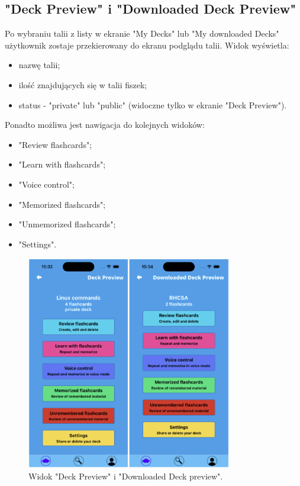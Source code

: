 \subsection{"Deck Preview" i "Downloaded Deck Preview"}
Po wybraniu talii z listy w ekranie "My Decks" lub "My downloaded Decks" użytkownik zostaje przekierowany do ekranu podglądu talii. Widok wyświetla:
\begin{itemize}
    \item nazwę talii;
    \item ilość znajdujących się w talii fiszek;
    \item status - "private" lub "public" (widoczne tylko w ekranie "Deck Preview").
\end{itemize}

Ponadto możliwa jest nawigacja do kolejnych widoków:
\begin{itemize}
    \item "Review flashcards";
    \item "Learn with flashcards";
    \item "Voice control";
    \item "Memorized flashcards";
    \item "Unmemorized flashcards";
    \item "Settings".
\end{itemize}

\begin{figure}[H]
    \centering
    \includegraphics[width=0.8\textwidth]{chapters/chapter_10/images_mobile/mobile_deck_preview}
    \caption{Widok "Deck Preview" i "Downloaded Deck preview".}
    \label{img:mobile_deck_preview}
\end{figure}


